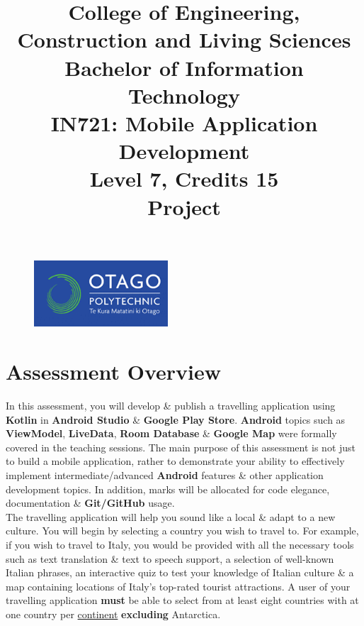 \documentclass{article}
\author{}
\begin{document}
\begin{figure}
	\centering
	\includegraphics[width=50mm]{../../resources/img/logo.png}
\end{figure}

\title{College of Engineering, Construction and Living Sciences\\Bachelor of Information Technology\\IN721: Mobile Application Development\\Level 7, Credits 15\\\textbf{Project}}
\date{}
\maketitle

\section*{Assessment Overview}
In this assessment, you will develop \& publish a travelling application using \textbf{Kotlin} in \textbf{Android Studio} \& \textbf{Google Play Store}. \textbf{Android} topics such as \textbf{ViewModel}, \textbf{LiveData}, \textbf{Room Database} \& \textbf{Google Map} were formally covered in the teaching sessions. The main purpose of this assessment is not just to build a mobile application, rather to demonstrate your ability to effectively implement intermediate/advanced \textbf{Android} features \& other application development topics. In addition, marks will be allocated for code elegance, documentation \& \textbf{Git/GitHub} usage. \\

The travelling application will help you sound like a local \& adapt to a new culture. You will begin by selecting a country you wish to travel to. For example, if you wish to travel to Italy, you would be provided with all the necessary tools such as text translation \& text to speech support, a selection of well-known Italian phrases, an interactive quiz to test your knowledge of Italian culture \& a map containing locations of Italy's top-rated tourist attractions. A user of your travelling application \textbf{must} be able to select from at least eight countries with at one country per \href{https://www.worldometers.info/geography/7-continents/}{continent} \textbf{excluding} Antarctica. 
\end{document}
